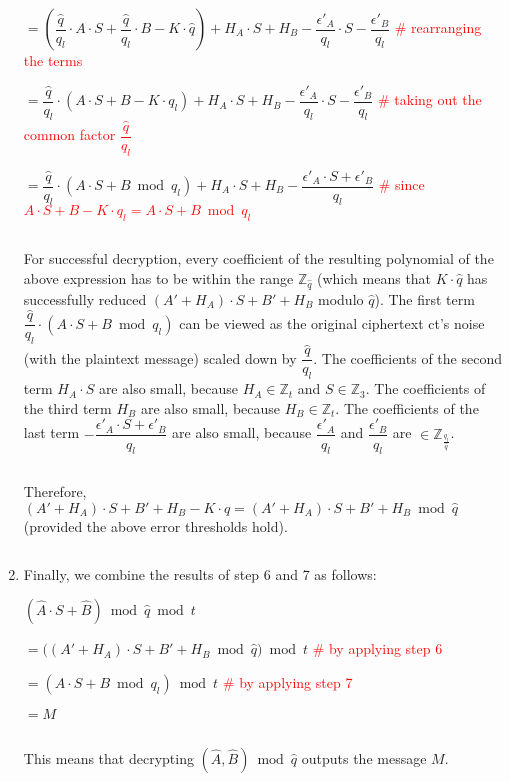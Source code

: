 \begin{enumerate}
$ = \left(\dfrac{\hat{q}}{q_{l}}\cdot A\cdot S + \dfrac{\hat{q}}{q_{l}}\cdot B  - K\cdot \hat{q}\right) + H_A\cdot S + H_B - \dfrac{\epsilon'_A}{q_{l}}\cdot S - \dfrac{\epsilon'_B}{q_{l}}$ \textcolor{red}{ \# rearranging the terms}

$ = \dfrac{\hat{q}}{q_{l}}\cdot(A\cdot S + B  - K\cdot q_{l}) + H_A\cdot S + H_B - \dfrac{\epsilon'_A}{q_{l}}\cdot S - \dfrac{\epsilon'_B}{q_{l}}$ \textcolor{red}{ \# taking out the common factor $\dfrac{\hat{q}}{q_{l}}$}

$ = \dfrac{\hat{q}}{q_{l}}\cdot(A\cdot S + B \bmod q_l) + H_A\cdot S + H_B - \dfrac{\epsilon'_A\cdot S + \epsilon'_B}{q_{l}}$ \textcolor{red}{ \# since $A\cdot S + B - K\cdot q_{l} = A\cdot S + B \bmod q_l$}

$ $

For successful decryption, every coefficient of the resulting polynomial of the above expression has to be within the range $\mathbb{Z}_{\hat{q}}$ (which means that $K\cdot\hat{q}$ has successfully reduced $(A' + H_A)\cdot S + B' + H_B$ modulo $\hat{q}$). The first term $\dfrac{\hat{q}}{q_{l}}\cdot(A\cdot S + B \bmod q_l)$ can be viewed as the original ciphertext \textsf{ct}'s noise (with the plaintext message) scaled down by $\dfrac{\hat{q}}{q_l}$. The coefficients of the second term $H_A \cdot S$ are also small, because $H_A \in \mathbb{Z}_t$ and $S \in \mathbb{Z}_3$. The coefficients of the third term $H_B$ are also small, because $H_B \in \mathbb{Z}_t$. The coefficients of the last term $- \dfrac{\epsilon'_A\cdot S + \epsilon'_B}{q_{l}}$ are also small, because $\dfrac{\epsilon'_A}{q_l}$ and $\dfrac{\epsilon'_B}{q_l}$ are $\in \mathbb{Z}_{\frac{q_l}{\hat{q}}}$. 

$ $

Therefore, $(A' + H_A)\cdot S + B' + H_B - K\cdot \hat{q} = (A' + H_A)\cdot S + B' + H_B \bmod \hat{q}$ (provided the above error thresholds hold). 

$ $

\item Finally, we combine the results of step 6 and 7 as follows: 

$(\hat{A}\cdot S + \hat{B}) \bmod \hat{q} \bmod t$

$= \bm((A' + H_A)\cdot S + B' + H_B \bmod \hat{q}\bm) \bmod t$ \textcolor{red}{ \# by applying step 6}

$ = (A\cdot S + B \bmod q_l) \bmod t$ \textcolor{red}{ \# by applying step 7}

$ = M$

$ $

This means that decrypting $(\hat{A}, \hat{B}) \bmod \hat{q}$ outputs the message $M$.

\end{enumerate}

